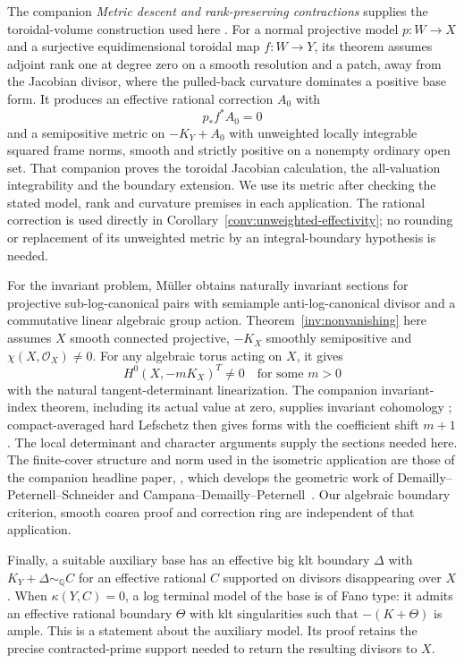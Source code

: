 The companion \emph{Metric descent and rank-preserving contractions}
supplies the toroidal-volume construction used here
\cite[Theorem~2.1]{CompanionG}.  For a normal
projective model $p:W\to X$ and a surjective equidimensional toroidal
map $f:W\to Y$, its theorem assumes adjoint rank one at degree zero
on a smooth resolution and a patch, away from the Jacobian divisor,
where the pulled-back curvature dominates a positive base form.
It produces an effective rational correction $A_0$ with
\[
 p_*f^*A_0=0
\]
and a semipositive metric on $-K_Y+A_0$ with unweighted locally
integrable squared frame norms, smooth and strictly positive on a
nonempty ordinary open set.  That companion proves the toroidal
Jacobian calculation, the all-valuation integrability and the
boundary extension.  We use its metric after checking the stated
model, rank and curvature premises in each application.
The rational correction is used directly in
Corollary~\ref{conv:unweighted-effectivity}; no rounding or replacement
of its unweighted metric by an integral-boundary hypothesis is needed.

For the invariant problem, M\"uller \cite[Theorem~C]{Muller2025}
obtains naturally invariant sections for projective sub-log-canonical
pairs with semiample anti-log-canonical divisor and a commutative linear
algebraic group action.  Theorem~\ref{inv:nonvanishing} here assumes
$X$ smooth connected projective, $-K_X$ smoothly semipositive and
$\chi(X,\mathcal O_X)\ne0$.  For any algebraic torus acting on $X$,
it gives
\[
 H^0(X,-mK_X)^T\ne0\quad\text{for some }m>0
\]
with the natural tangent-determinant linearization.
The companion invariant-index theorem, including its actual value at
zero, supplies invariant cohomology
\cite[Theorem~1.1]{CompanionI}; compact-averaged hard Lefschetz
then gives forms with the coefficient shift $m+1$.
The local determinant and character arguments supply the sections
needed here.  The finite-cover structure and norm used in the
isometric application are those of the companion headline paper,
\cite[Theorem~2.1 and Lemma~2.2]{CompanionH}, which develops the geometric work of Demailly--Peternell--Schneider
and Campana--Demailly--Peternell~\cite{DPS1996,CDP2015}.
Our algebraic boundary criterion, smooth coarea proof and correction
ring are independent of that application.

Finally, a suitable auxiliary base has an effective big klt boundary
$\Delta$ with $K_Y+\Delta\sim_{\mathbb Q}C$ for an effective rational
$C$ supported on divisors disappearing over $X$.  When $\kappa(Y,C)=0$, a log
terminal model of the base is of Fano type: it admits an effective
rational boundary $\Theta$ with klt singularities such that
$-(K+\Theta)$ is ample.  This is a statement about
the auxiliary model.  Its proof retains the precise contracted-prime
support needed to return the resulting divisors to $X$.

